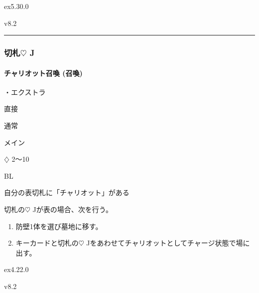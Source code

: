\documentclass[letterpaper,10pt,dvipdfmx]{sphinxmanual}
\begin{document}
\sphinxAtStartPar
{}  ex5.30.0

\sphinxAtStartPar
{}  v8.2


\bigskip\hrule\bigskip



\subsubsection{切札{\normalsize $\heartsuit$} J}
\label{\detokenize{auto/frameActionlist:id44}}

\paragraph{チャリオット召喚 (召喚)}
\label{\detokenize{auto/frameActionlist:act-summonchariot}}\label{\detokenize{auto/frameActionlist:id45}}
\sphinxAtStartPar
{}

\sphinxAtStartPar
・エクストラ

\sphinxAtStartPar
{} 直接

\sphinxAtStartPar
{} 通常

\sphinxAtStartPar
{} メイン

\sphinxAtStartPar
{} {\normalsize $\diamondsuit$} 2〜10

\sphinxAtStartPar
{} BL

\sphinxAtStartPar
{}

\sphinxAtStartPar
自分の表切札に「チャリオット」がある

\sphinxAtStartPar
{}

\sphinxAtStartPar
切札の{\normalsize $\heartsuit$} Jが表の場合、次を行う。
\begin{enumerate}
%
\item {} 
\sphinxAtStartPar
防壁1体を選び墓地に移す。

\item {} 
\sphinxAtStartPar
キーカードと切札の{\normalsize $\heartsuit$} Jをあわせてチャリオットとしてチャージ状態で場に出す。

\end{enumerate}

\sphinxAtStartPar
{}  ex4.22.0

\sphinxAtStartPar
{}  v8.2
\end{document}
